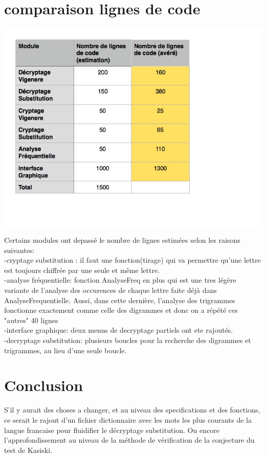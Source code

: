 \documentclass[a4]{article}
\begin{document}
	\section{comparaison lignes de code}
		\begin{center}\includegraphics[scale=0.5]{preview.jpg}\end{center}
		Certains modules ont depassé le nombre de lignes estimées selon les raisons suivantes: \\
		-cryptage substitution : il faut une fonction(tirage) qui va permettre qu'une lettre est toujours chiffrée
		 par une seule et même lettre. \\
		-analyse fréquentielle: fonction AnalyseFreq en plus qui est une tres légère variante de l'analyse des occurences de 
		chaque lettre faite déjà dans AnalyseFrequentielle. Aussi, dans cette dernière, l'analyse des trigrammes fonctionne exactement
		comme celle des digrammes et donc on a répété ces "autres" 40 lignes \\
		-interface graphique: deux menus de decryptage partiels ont ete rajoutés.\\
		-decryptage substitution: plusieurs boucles pour la recherche des digrammes et trigrammes, au lieu
		d'une seule boucle.
		
	
	\section{Conclusion}

	
S'il y aurait des choses a changer, et au niveau des specifications et des fonctions, ce serait le rajout d'un fichier dictionnaire avec les mots les plus courants de la langue francaise pour fluidifier
	le décryptage substitution.
	Ou encore l'approfondissement au niveau de la méthode de vérification de la conjecture du test de Kasiski. \\ \\
\end{document}
